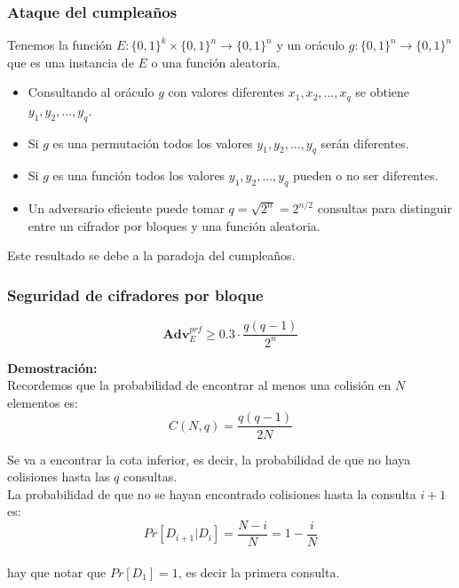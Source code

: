\documentclass{beamer}
\newcommand{\binStr}{\{0,1\}}
\begin{document}
\frame
{
	\frametitle{Ataque del cumpleaños}

Tenemos la función $E:\binStr^k \times \binStr^n \rightarrow \binStr^n$ y un oráculo $g:\binStr^n \rightarrow \binStr^n$ que es una instancia de $E$ o una función aleatoria.\\
\begin{itemize}
\item Consultando al oráculo $g$ con valores diferentes $x_1,x_2,...,x_q$ se obtiene $y_1,y_2,...,y_q$.\\


\item Si $g$ es una permutación todos los valores $y_1,y_2,...,y_q$ serán diferentes.


\item Si $g$ es una función todos los valores $y_1,y_2,...,y_q$ pueden o no ser diferentes.


\item Un adversario eficiente puede tomar $q=\sqrt{2^n}=2^{n/2}$ consultas para distinguir entre un cifrador por bloques y una función aleatoria.
\end{itemize}\pause

{\color{red} Este resultado se debe a la paradoja del cumpleaños.}

}

\frame
{
	\frametitle{Seguridad de cifradores por bloque}


$$\mathbf{Adv}_{E}^{prf}\geq 0.3\cdot \frac{q(q-1)}{2^n} $$

\textbf{Demostración:}\\

Recordemos que la probabilidad de encontrar al menos una colisión en $N$ elementos es:\\
$$C(N,q)=\frac{q(q-1)}{2N}$$

Se va a encontrar la cota inferior, es decir, la probabilidad de que no haya colisiones hasta las $q$ consultas.\\

La probabilidad de que no se hayan encontrado colisiones hasta la consulta $i+1$ es:\\

$$Pr\left[ D_{i+1}|D_i\right]=\frac{N-i}{N}=1-\frac{i}{N}$$\\

hay que notar que $Pr[D_1] = 1$, es decir la primera consulta. 
}
\end{document}
